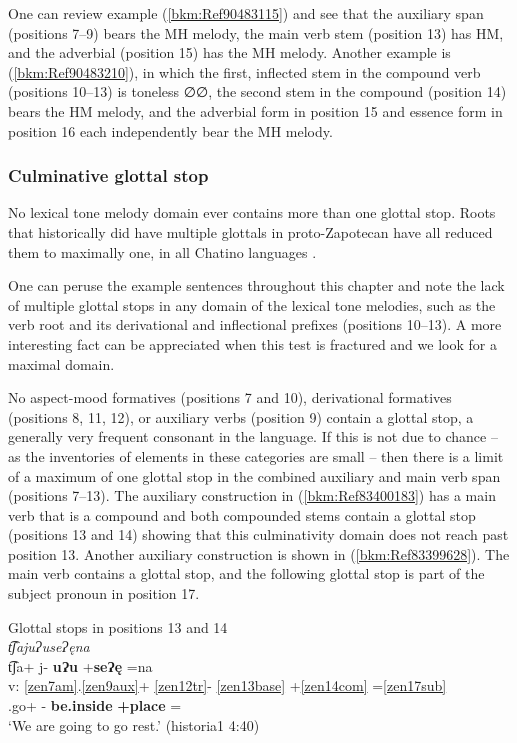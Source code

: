 \documentclass[output=paper]{langscibook}
\begin{document}
One can review example (\ref{bkm:Ref90483115}) and see that the auxiliary span (positions 7{}--9) bears the MH melody, the main verb stem (position 13) has HM, and the adverbial (position 15) has the MH melody. Another example is (\ref{bkm:Ref90483210}), in which the first, inflected stem in the compound verb (positions 10{}--13) is toneless ∅∅, the second stem in the compound (position 14) bears the HM melody, and the adverbial form in position 15 and essence form in position 16 each independently bear the MH melody.

\subsubsection{Culminative glottal stop} 
\label{bkm:Ref113372574}
No lexical tone melody domain ever contains more than one glottal stop. Roots that historically did have multiple glottals in proto-Zapotecan have all reduced them to maximally one, in all Chatino languages \citep{Campbell2021b}. 

\label{bkm:Ref113308189}
One can peruse the example sentences throughout this chapter and note the lack of multiple glottal stops in any domain of the lexical tone melodies, such as the verb root and its derivational and inflectional prefixes (positions 10{}--13). A more interesting fact can be appreciated when this test is fractured and we look for a maximal domain.

\label{bkm:Ref113308202}
No aspect-mood formatives (positions 7 and 10), derivational formatives (positions 8, 11, 12), or auxiliary verbs (position 9) contain a glottal stop, a generally very frequent consonant in the language. If this is not due to chance -- as the inventories of elements in these categories are small -- then there is a limit of a maximum of one glottal stop in the combined auxiliary and main verb span (positions 7{}--13). The auxiliary construction in (\ref{bkm:Ref83400183}) has a main verb that is a compound and both compounded stems contain a glottal stop (positions 13 and 14) showing that this culminativity domain does not reach past position 13. Another auxiliary construction is shown in (\ref{bkm:Ref83399628}). The main verb contains a glottal stop, and the following glottal stop is part of the subject pronoun in position 17.


\ea\label{bkm:Ref83400183}Glottal stops in positions 13 and 14\\
\textit{ t͡ʃajuɁuseɁęna}\\
\glll {} t͡ʃa+ j{}- \textbf{uɁu} +\textbf{seɁę} =na \\
v: \ref{zen7am}.\ref{zen9aux}+ \ref{zen12tr}{}- \ref{zen13base} +\ref{zen14com} =\ref{zen17sub}\\
{} \Pot{}.go+ \Itr{}- \textbf{be.inside} \textbf{+place} =\First\Incl{}\\
\glt `We are going to go rest.' (historia1 4:40)
\z
\end{document}
